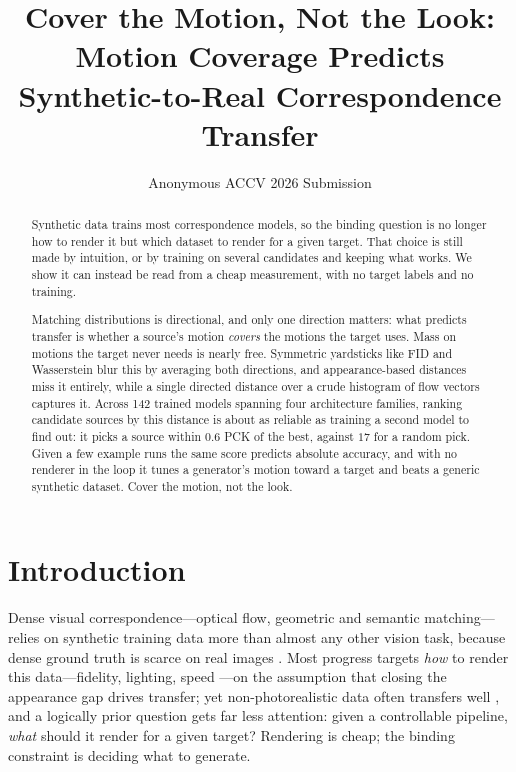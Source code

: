 \documentclass[runningheads]{llncs}
\newcommand{\pck}{PCK}
\begin{document}
\title{Cover the Motion, Not the Look: Motion Coverage Predicts
Synthetic-to-Real Correspondence Transfer}

\author{Anonymous ACCV 2026 Submission}

\maketitle

\begin{abstract}
Synthetic data trains most correspondence models, so the binding question is no
longer how to render it but which dataset to render for a given target. That
choice is still made by intuition, or by training on several candidates and
keeping what works. We show it can instead be read from a cheap measurement,
with no target labels and no training.

Matching distributions is directional, and only one direction matters: what
predicts transfer is whether a source's motion \emph{covers} the motions the
target uses. Mass on motions the target never needs is nearly free. Symmetric yardsticks like
FID and Wasserstein blur this by averaging both directions, and appearance-based
distances miss it entirely, while a single directed distance over a crude
histogram of flow vectors captures it. Across 142 trained models spanning four
architecture families, ranking candidate sources by this distance is about as
reliable as training a second model to find out: it picks a source within $0.6$
\pck{} of the best, against $17$ for a random pick. Given a few example runs the
same score predicts absolute accuracy, and with no renderer in the loop it tunes
a generator's motion toward a target and beats a generic synthetic dataset.
Cover the motion, not the look.
\end{abstract}

\section{Introduction}
\label{sec:intro}

Dense visual correspondence---optical flow, geometric and semantic
matching---relies on synthetic training data more than almost any other vision
task, because dense ground truth is scarce on real images
\cite{mayer2016FlyingThingsDataset,sintel,greff2021kubric,pointodyssey}. Most
progress targets \emph{how} to render this data---fidelity, lighting, speed
\cite{greff2021kubric,pointodyssey}---on the assumption that closing the
appearance gap drives transfer; yet non-photorealistic data often transfers well
\cite{Baradad2021LookingAtNoise,white2009mandelbulb}, and a logically prior
question gets far less attention: given a controllable pipeline, \emph{what}
should it render for a given target? Rendering is cheap; the binding constraint
is deciding what to generate.
\end{document}
